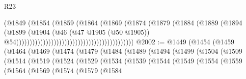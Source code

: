 \begin{lexlean}{R23}
\begin{coremodule}
                                                                  (@1849
                                                                    (@1854
                                                                      (@1859
                                                                        (@1864
                                                                          (@1869
                                                                            (@1874
                                                                              (@1879
                                                                                (@1884
                                                                                  (@1889
                                                                                    (@1894
                                                                                      (@1899
                                                                                        (@1904
                                                                                          (@46
                                                                                            (@47
                                                                                              @1905
                                                                                              (@50
                                                                                                @1905))
                                                                                            @54))))))))))))))))))))))))))))))))))))))))))))
@2002 := @1449
    (@1454
      (@1459
        (@1464
          (@1469
            (@1474
              (@1479
                (@1484
                  (@1489
                    (@1494
                      (@1499
                        (@1504
                          (@1509
                            (@1514
                              (@1519
                                (@1524
                                  (@1529
                                    (@1534
                                      (@1539
                                        (@1544
                                          (@1549
                                            (@1554
                                              (@1559
                                                (@1564
                                                  (@1569
                                                    (@1574
                                                      (@1579
                                                        (@1584

\end{coremodule}
\end{lexlean}

